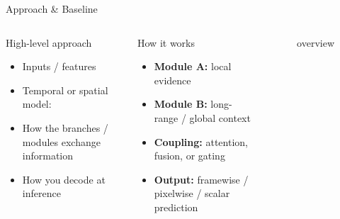 \documentclass[9pt,aspectratio=169]{beamer}
\begin{document}
\begin{frame}{Approach \& Baseline}
  \begin{columns}[T,onlytextwidth]
      \begin{block}{High-level approach}
        \begin{itemize}
          \item Inputs / features
          \item Temporal or spatial model: \methodname
          \item How the branches / modules exchange information
          \item How you decode at inference
        \end{itemize}
      \end{block}

      \begin{block}{How it works}
        \begin{itemize}
          \item \textbf{Module A:} local evidence
          \item \textbf{Module B:} long-range / global context
          \item \textbf{Coupling:} attention, fusion, or gating
          \item \textbf{Output:} framewise / pixelwise / scalar prediction
        \end{itemize}
      \end{block}

      \begin{minipage}[c][0.75\textheight][c]{\linewidth}
        \begin{block}{}
          \begin{figure}
            \centering
            \vspace{-1.0em}
            \caption{\methodname overview}
            \vspace{-1.2em}
          \end{figure}
        \end{block}
      \end{minipage}
  \end{columns}
\end{frame}
\end{document}
